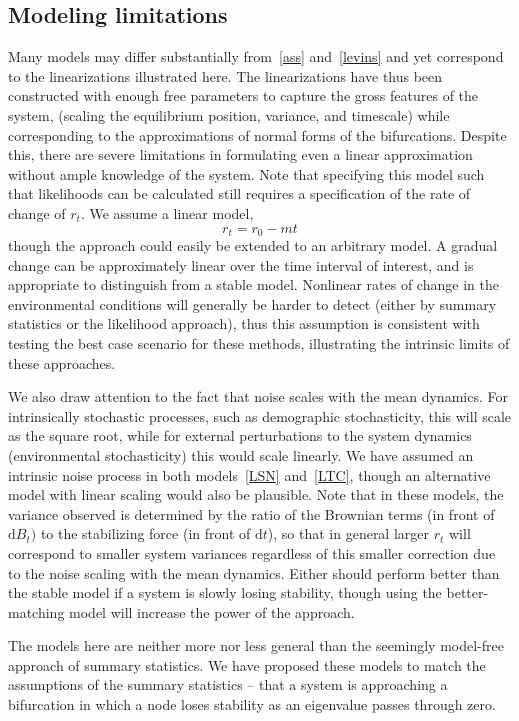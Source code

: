 \documentclass[authoryear, preprint,review,12pt]{elsarticle}
\newcommand{\ud}{\mathrm{d}}
\begin{document}
\subsection{Modeling limitations}
Many models may differ substantially from~\eqref{ass} and~\eqref{levins} and yet correspond to the linearizations illustrated here.  
The linearizations have thus been constructed with enough free parameters to capture the gross features of the system,
(scaling the equilibrium position, variance, and timescale) while corresponding to the approximations of normal forms of the bifurcations.  
Despite this, there are severe limitations in formulating even a linear approximation without ample knowledge of the system. 
Note that specifying this model such that likelihoods can be calculated still requires a specification of the rate of change of $r_t$.
We assume a linear model,
\begin{equation}
r_t = r_0 - m t
\label{R_t}
\end{equation}
though the approach could easily be extended to an arbitrary model.
A gradual change can be approximately linear over the time interval of interest, and is appropriate to distinguish from a stable model.
Nonlinear rates of change in the environmental conditions will generally be harder to detect (either by summary statistics or the likelihood approach),
thus this assumption is consistent with testing the best case scenario for these methods, illustrating the intrinsic limits of these approaches.  

We also draw attention to the fact that noise scales with the mean dynamics.  
For intrinsically stochastic processes, such as demographic stochasticity, this will scale as the square root, 
while for external perturbations to the system dynamics (environmental stochasticity) this would scale linearly.
We have assumed an intrinsic noise process in both models~\eqref{LSN} and~\eqref{LTC}, 
though an alternative model with linear scaling would also be plausible.  
Note that in these models, the variance observed is determined by the ratio of the Brownian terms (in front of $\ud B_t)$
to the stabilizing force (in front of $\ud t$), so that in general larger $r_t$ will correspond to smaller system variances
regardless of this smaller correction due to the noise scaling with the mean dynamics.  
Either should perform better than the stable model if a system is slowly losing stability,
though using the better-matching model will increase the power of the approach.  

The models here are neither more nor less general than the seemingly model-free approach of summary statistics.  
We have proposed these models to match the assumptions of the summary statistics -- 
that a system is approaching a bifurcation in which a node loses stability as an eigenvalue passes through zero.  
\end{document}
